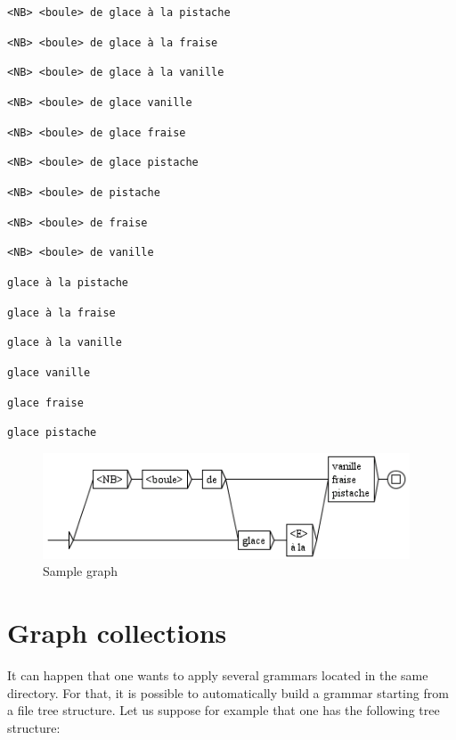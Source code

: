 \bigskip
\noindent
\texttt{<NB> <boule> de glace \`a la pistache}

\noindent
\texttt{<NB> <boule> de glace \`a la fraise}

\noindent
\texttt{<NB> <boule> de glace \`a la vanille}

\noindent
\texttt{<NB> <boule> de glace vanille}

\noindent
\texttt{<NB> <boule> de glace fraise}

\noindent
\texttt{<NB> <boule> de glace pistache}

\noindent
\texttt{<NB> <boule> de pistache}

\noindent
\texttt{<NB> <boule> de fraise}

\noindent
\texttt{<NB> <boule> de vanille}

\noindent
\texttt{glace \`a la pistache}

\noindent
\texttt{glace \`a la fraise}

\noindent
\texttt{glace \`a la vanille}

\noindent
\texttt{glace vanille}

\noindent
\texttt{glace fraise}

\noindent
\texttt{glace pistache}

\begin{figure}[!h]
\begin{center}
\includegraphics[width=10.9cm]{resources/img/fig6-19.png}
\caption{Sample graph \label{fig-glace}}
\end{center}
\end{figure}




\section{Graph collections}

It can happen that one wants to apply several grammars located in the same directory. For
that, it is possible to automatically build a grammar starting from a file tree
structure. Let us suppose for example that one has the following tree structure:

